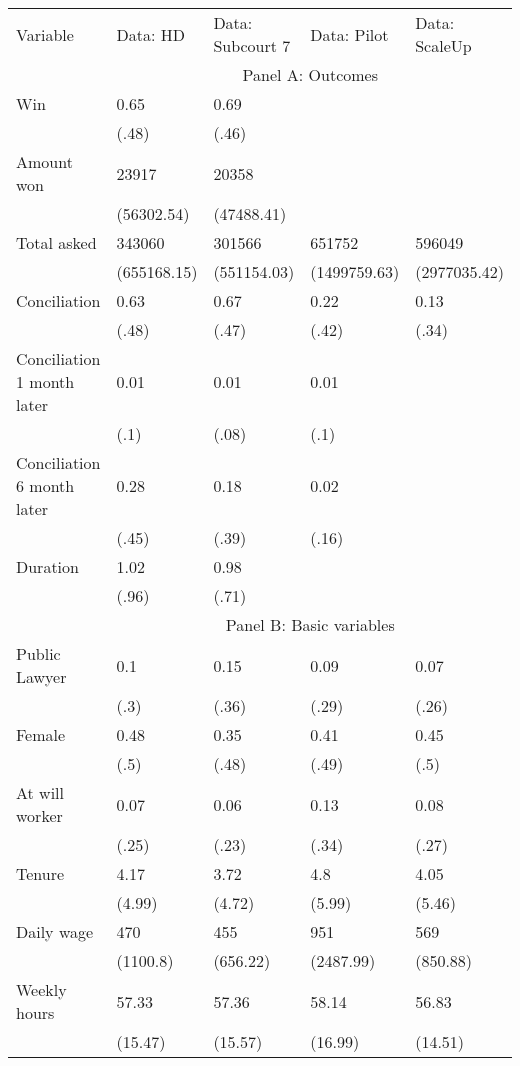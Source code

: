 \begin{tabular}{lllll}
\toprule
Variable & Data: HD & Data: Subcourt 7 & Data: Pilot & Data: ScaleUp \\
      & \multicolumn{4}{c}{Panel A: Outcomes} \\
\cmidrule{2-5}Win   & 0.65  & 0.69  &       &  \\
      & (.48) & (.46) &       &  \\
Amount won & 23917 & 20358 &       &  \\
      & (56302.54) & (47488.41) &       &  \\
Total asked & 343060 & 301566 & 651752 & 596049 \\
      & (655168.15) & (551154.03) & (1499759.63) & (2977035.42) \\
Conciliation  & 0.63  & 0.67  & 0.22  & 0.13 \\
      & (.48) & (.47) & (.42) & (.34) \\
Conciliation 1 month later & 0.01  & 0.01  & 0.01  &  \\
      & (.1)  & (.08) & (.1)  &  \\
Conciliation 6 month later & 0.28  & 0.18  & 0.02  &  \\
      & (.45) & (.39) & (.16) &  \\
Duration & 1.02  & 0.98  &       &  \\
      & (.96) & (.71) &       &  \\
\cmidrule{2-5}      & \multicolumn{4}{c}{Panel B: Basic variables} \\
\cmidrule{2-5}Public Lawyer & 0.1   & 0.15  & 0.09  & 0.07 \\
      & (.3)  & (.36) & (.29) & (.26) \\
Female & 0.48  & 0.35  & 0.41  & 0.45 \\
      & (.5)  & (.48) & (.49) & (.5) \\
At will worker & 0.07  & 0.06  & 0.13  & 0.08 \\
      & (.25) & (.23) & (.34) & (.27) \\
Tenure & 4.17  & 3.72  & 4.8   & 4.05 \\
      & (4.99) & (4.72) & (5.99) & (5.46) \\
Daily wage & 470   & 455   & 951   & 569 \\
      & (1100.8) & (656.22) & (2487.99) & (850.88) \\
Weekly hours & 57.33 & 57.36 & 58.14 & 56.83 \\
      & (15.47) & (15.57) & (16.99) & (14.51) \\

\end{tabular}
